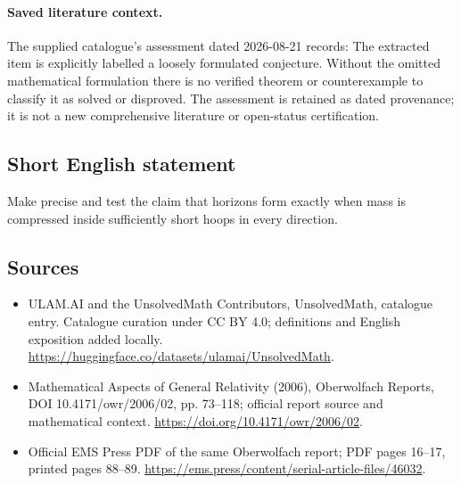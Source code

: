 \documentclass[11pt]{article}
\begin{document}
\paragraph{Saved literature context.} The supplied catalogue's assessment dated 2026-08-21 records: The extracted item is explicitly labelled a loosely formulated conjecture. Without the omitted mathematical formulation there is no verified theorem or counterexample to classify it as solved or disproved. The assessment is retained as dated provenance; it is not a new comprehensive literature or open-status certification.
\subsection{Short English statement}
Make precise and test the claim that horizons form exactly when mass is compressed inside sufficiently short hoops in every direction.
\subsection{Sources}
\begin{itemize}
\item[\hypertarget{source:statement:1}{S1}] ULAM.AI and the UnsolvedMath Contributors, UnsolvedMath, catalogue entry. Catalogue curation under CC BY 4.0; definitions and English exposition added locally.
\url{https://huggingface.co/datasets/ulamai/UnsolvedMath}.
\item[\hypertarget{source:statement:2}{S2}] Mathematical Aspects of General Relativity (2006), Oberwolfach Reports, DOI 10.4171/owr/2006/02, pp. 73--118; official report source and mathematical context.
\url{https://doi.org/10.4171/owr/2006/02}.
\item[\hypertarget{source:statement:3}{S3}] Official EMS Press PDF of the same Oberwolfach report; PDF pages 16--17, printed pages 88--89.
\url{https://ems.press/content/serial-article-files/46032}.
\end{itemize}
\label{end:statement}
\end{document}
